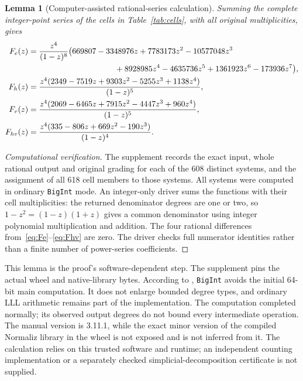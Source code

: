 \documentclass[11pt]{article}
\newtheorem{lemma}[theorem]{Lemma}
\theoremstyle{remark}
\numberwithin{equation}{section}
\begin{document}
\begin{lemma}[Computer-assisted rational-series calculation]\label{lem:series}
Summing the complete integer-point series of the cells in
Table~\ref{tab:cells}, with all original multiplicities, gives
\begin{align}
 F_e(z)&=\frac{z^4}{(1-z)^8}
 \bigl(669807-3348976z+7783173z^2-10577048z^3 \notag\\
 &\hspace{38mm}+8928985z^4-4635736z^5+1361923z^6-173936z^7\bigr),
 \label{eq:Fe}\\
 F_h(z)&=\frac{z^4(2349-7519z+9303z^2-5255z^3+1138z^4)}
                    {(1-z)^5},\label{eq:Fh}\\
 F_v(z)&=\frac{z^4(2069-6465z+7915z^2-4447z^3+960z^4)}
                    {(1-z)^5},\label{eq:Fv}\\
 F_{hv}(z)&=\frac{z^4(335-806z+669z^2-190z^3)}
                    {(1-z)^4}.\label{eq:Fhv}
\end{align}
\end{lemma}

\begin{proof}[Computational verification]
The supplement records the exact input, whole rational output and original
grading for each of the 608 distinct systems, and the assignment of all
618 cell members to those systems.
All systems were computed in ordinary \texttt{BigInt} mode.
An integer-only driver sums the functions with their cell multiplicities:
the returned denominator degrees are one or two, so
$1-z^2=(1-z)(1+z)$ gives a common denominator using integer polynomial
multiplication and addition.
The four rational differences from~\eqref{eq:Fe}--\eqref{eq:Fhv} are zero.
The driver checks full numerator identities rather than a finite number of
power-series coefficients.
\end{proof}

This lemma is the proof's software-dependent step. The supplement pins the
actual wheel and native-library bytes.
According to \cite[Section~5.3 and Appendix~E.2.10]{Normaliz},
\texttt{BigInt} avoids the initial 64-bit main computation.
It does not enlarge bounded degree types, and ordinary LLL arithmetic remains
part of the implementation. The computation completed normally; its observed
output degrees do not bound every intermediate operation.
The manual version is 3.11.1, while the exact minor version of the compiled
Normaliz library in the wheel is not exposed and is not inferred from it.
The calculation relies on this trusted software and runtime; an independent
counting implementation or a separately checked simplicial-decomposition
certificate is not supplied.
\end{document}
